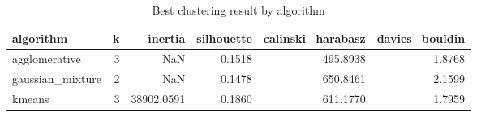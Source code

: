\begin{table}
\caption{Best clustering result by algorithm}
\label{tab:clustering-model-comparison}
\begin{tabular}{lrrrrr}
\toprule
algorithm & k & inertia & silhouette & calinski\_harabasz & davies\_bouldin \\
\midrule
agglomerative & 3 & NaN & 0.1518 & 495.8938 & 1.8768 \\
gaussian\_mixture & 2 & NaN & 0.1478 & 650.8461 & 2.1599 \\
kmeans & 3 & 38902.0591 & 0.1860 & 611.1770 & 1.7959 \\
\bottomrule
\end{tabular}
\end{table}
